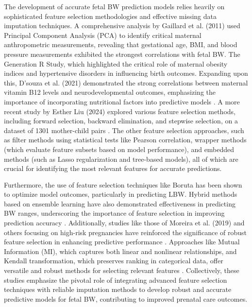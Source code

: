 \documentclass[12pt]{article}
\begin{document}
The development of accurate fetal BW prediction models relies heavily on sophisticated feature selection methodologies and effective missing data imputation techniques. A comprehensive analysis by Gaillard et al. (2011)\cite{11A} used Principal Component Analysis (PCA) to identify critical maternal anthropometric measurements, revealing that gestational age, BMI, and blood pressure measurements exhibited the strongest correlations with fetal BW. The Generation R Study, which highlighted the critical role of maternal obesity indices and hypertensive disorders in influencing birth outcomes. Expanding upon this, D'souza et al. (2021) demonstrated the strong correlations between maternal vitamin B12 levels and neurodevelopmental outcomes, emphasizing the importance of incorporating nutritional factors into predictive models \cite{12A}. A more recent study by Esther Liu (2024) explored various feature selection methods, including forward selection, backward elimination, and stepwise selection, on a dataset of 1301 mother-child pairs \cite{13A}. The other feature selection approaches, such as filter methods using statistical tests like Pearson correlation, wrapper methods (which evaluate feature subsets based on model performance), and embedded methods (such as Lasso regularization and tree-based models)\cite{14A}, all of which are crucial for identifying the most relevant features for accurate predictions. 

Furthermore, the use of feature selection techniques like Boruta has been shown to optimize model outcomes, particularly in predicting LBW. Hybrid methods based on ensemble learning have also demonstrated effectiveness in predicting BW ranges, underscoring the importance of feature selection in improving prediction accuracy \cite{15A}. Additionally, studies like those of Moreira et al. (2019) and others focusing on high-risk pregnancies have reinforced the significance of robust feature selection in enhancing predictive performance \cite{16A}. Approaches like Mutual Information (MI), which captures both linear and nonlinear relationships\cite{17A}, and Kendall transformation, which preserves ranking in categorical data, offer versatile and robust methods for selecting relevant features \cite{18A}. Collectively, these studies emphasize the pivotal role of integrating advanced feature selection techniques with reliable imputation methods to develop robust and accurate predictive models for fetal BW, contributing to improved prenatal care outcomes.
\end{document}
